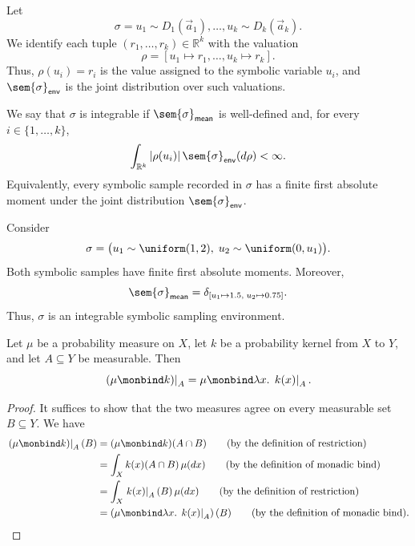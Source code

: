 \begin{definition}
  Let
  \[
    \sigma
    =
    u_1\sim D_1(\vec a_1),\ldots,
    u_k\sim D_k(\vec a_k).
  \]
  We identify each tuple $(r_1,\ldots,r_k)\in\mathbb R^k$ with the
  valuation
  \[
    \rho
    =
    [u_1\mapsto r_1,\ldots,u_k\mapsto r_k].
  \]
  Thus, $\rho(u_i)=r_i$ is the value assigned to the symbolic variable
  $u_i$, and $\sem{\sigma}_{\mathsf{env}}$ is the joint distribution
  over such valuations.

  We say that $\sigma$ is integrable if
  $\sem{\sigma}_{\mathsf{mean}}$ is well-defined and, for every
  $i\in\{1,\ldots,k\}$,
  \[
    \int_{\mathbb R^k}
      |\rho(u_i)|\,
      \sem{\sigma}_{\mathsf{env}}(d\rho)
    <
    \infty.
  \]
  Equivalently, every symbolic sample recorded in $\sigma$ has a
  finite first absolute moment under the joint distribution
  $\sem{\sigma}_{\mathsf{env}}$.
\end{definition}

\begin{example}
  Consider
  \[
    \sigma
    =
    \bigl(
      u_1\sim\uniform(1,2),\;
      u_2\sim\uniform(0,u_1)
    \bigr).
  \]
  Both symbolic samples have finite first absolute moments. Moreover,
  \[
    \sem{\sigma}_{\mathsf{mean}}
    =
    \delta_{[u_1\mapsto 1.5,\;u_2\mapsto 0.75]}.
  \]
  Thus, $\sigma$ is an integrable symbolic sampling environment.
\end{example}

\begin{lemma}
  \label{lem:restriction-of-bind}
  Let $\mu$ be a probability measure on $X$, let $k$ be a probability
  kernel from $X$ to $Y$, and let $A\subseteq Y$ be measurable. Then
  \[
    \left.(\mu\monbind k)\right|_A
    =
    \mu\monbind
    \lambda x.\,
    \left.k(x)\right|_A.
  \]
\end{lemma}

\begin{proof}
  It suffices to show that the two measures agree on every measurable
  set $B\subseteq Y$. We have
  \begin{align}
    \left.(\mu\monbind k)\right|_A(B)
    &=
    (\mu\monbind k)(A\cap B)
    \tag{\text{by the definition of restriction}}
    \\
    &=
    \int_X k(x)(A\cap B)\,\mu(dx)
    \tag{\text{by the definition of monadic bind}}
    \\
    &=
    \int_X \left.k(x)\right|_A(B)\,\mu(dx)
    \tag{\text{by the definition of restriction}}
    \\
    &=
    \left(
      \mu\monbind\lambda x.\,\left.k(x)\right|_A
    \right)(B)
    \tag{\text{by the definition of monadic bind}}.
  \end{align}
\end{proof}


